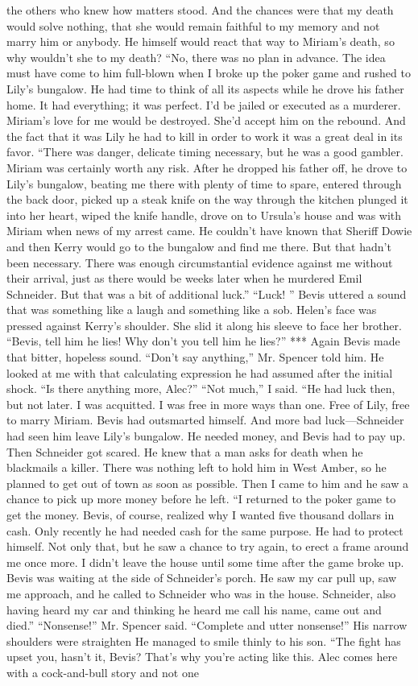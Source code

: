 \documentclass{novel}
\begin{document}
the others who knew how matters stood. And the chances were that my death would solve nothing, that she would remain faithful to my memory and not marry him or anybody. He himself would react that way to Miriam’s death, so why wouldn’t she to my death? “No, there was no plan in advance. The idea must have come to him full-blown when I broke up the poker game and rushed to Lily’s bungalow. He had time to think of all its aspects while he drove his father home. It had everything; it was perfect. I’d be jailed or executed as a murderer. Miriam’s love for me would be destroyed. She’d accept him on the rebound. And the fact that it was Lily he had to kill in order to work it was a great deal in its favor. “There was danger, delicate timing necessary, but he was a good gambler. Miriam was certainly worth any risk. After he dropped his father off, he drove to Lily’s bungalow, beating me there with plenty of time to spare, entered through the back door, picked up a steak knife on the way through the kitchen plunged it into her heart, wiped the knife handle, drove on to Ursula’s house and was with Miriam when news of my arrest came. He couldn’t have known that Sheriff Dowie and then Kerry would go to the bungalow and find me there. But that hadn’t been necessary. There was enough circumstantial evidence against me without their arrival, just as there would be weeks later when he murdered Emil Schneider. But that was a bit of additional luck.” “Luck! ” Bevis uttered a sound that was something like a laugh and something like a sob. Helen’s face was pressed against Kerry’s shoulder. She slid it along his sleeve to face her brother. “Bevis, tell him he lies! Why don’t you tell him he lies?” *** Again Bevis made that bitter, hopeless sound. “Don’t say anything,” Mr. Spencer told him. He looked at me with that calculating expression he had assumed after the initial shock. “Is there anything more, Alec?” “Not much,” I said. “He had luck then, but not later. I was acquitted. I was free in more ways than one. Free of Lily, free to marry Miriam. Bevis had outsmarted himself. And more bad luck—Schneider had seen him leave Lily’s bungalow. He needed money, and Bevis had to pay up. Then Schneider got scared. He knew that a man asks for death when he blackmails a killer. There was nothing left to hold him in West Amber, so he planned to get out of town as soon as possible. Then I came to him and he saw a chance to pick up more money before he left. “I returned to the poker game to get the money. Bevis, of course, realized why I wanted five thousand dollars in cash. Only recently he had needed cash for the same purpose. He had to protect himself. Not only that, but he saw a chance to try again, to erect a frame around me once more. I didn’t leave the house until some time after the game broke up. Bevis was waiting at the side of Schneider’s porch. He saw my car pull up, saw me approach, and he called to Schneider who was in the house. Schneider, also having heard my car and thinking he heard me call his name, came out and died.” “Nonsense!” Mr. Spencer said. “Complete and utter nonsense!” His narrow shoulders were straighten He managed to smile thinly to his son. “The fight has upset you, hasn’t it, Bevis? That’s why you’re acting like this. Alec comes here with a cock-and-bull story and not one 
\end{document}

